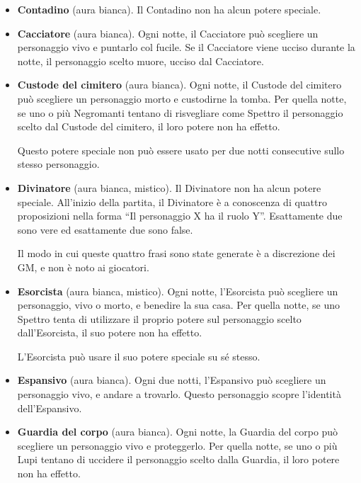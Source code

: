 \documentclass[a4paper,10pt]{article}
\begin{document}
\begin{itemize}
 \item {\bf Contadino} (aura bianca). Il Contadino non ha alcun potere speciale.

 \item {\bf Cacciatore} (aura bianca). Ogni notte, il Cacciatore può scegliere un personaggio vivo e puntarlo col fucile. Se il Cacciatore viene ucciso durante la notte, il personaggio scelto muore, ucciso dal Cacciatore.
 
 \item {\bf Custode del cimitero} (aura bianca). Ogni notte, il Custode del cimitero può scegliere un personaggio morto e custodirne la tomba. Per quella notte, se uno o più Negromanti tentano di risvegliare come Spettro il personaggio scelto dal Custode del cimitero, il loro potere non ha effetto.
 
 Questo potere speciale non può essere usato per due notti consecutive sullo stesso personaggio.

 \item {\bf Divinatore} (aura bianca, mistico). Il Divinatore non ha alcun potere speciale. All'inizio della partita, il Divinatore è a conoscenza di quattro proposizioni nella forma ``Il personaggio X ha il ruolo Y''. Esattamente due sono vere ed esattamente due sono false.
 
 Il modo in cui queste quattro frasi sono state generate è a discrezione dei GM, e non è noto ai giocatori.

 \item {\bf Esorcista} (aura bianca, mistico). Ogni notte, l'Esorcista può scegliere un personaggio, vivo o morto, e benedire la sua casa.
 Per quella notte, se uno Spettro tenta di utilizzare il proprio potere sul personaggio scelto dall'Esorcista, il suo potere non ha effetto.
 
 L'Esorcista può usare il suo potere speciale su sé stesso.
 
 \item {\bf Espansivo} (aura bianca). Ogni due notti, l'Espansivo può scegliere un personaggio vivo, e andare a trovarlo. Questo personaggio scopre l'identità dell'Espansivo.

 \item {\bf Guardia del corpo} (aura bianca). Ogni notte, la Guardia del corpo può scegliere un personaggio vivo e proteggerlo. Per quella notte, se uno o più Lupi tentano di uccidere il personaggio scelto dalla Guardia, il loro potere non ha effetto.
 

\end{itemize}
\end{document}
